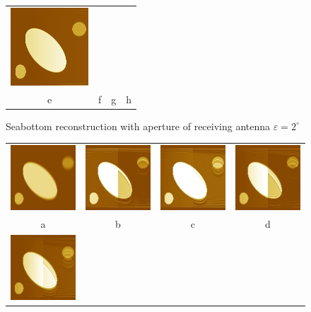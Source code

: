 \documentclass{procDDs}
\begin{document}
\begin{figure}[h!]
\begin{tabular}{cccc}
		\includegraphics[width=0.2\linewidth]{img/6/5.jpg}\\
		e & f & g & h \\
	\end{tabular}
	\caption{Seabottom reconstruction with aperture of receiving antenna $\varepsilon=2^\circ$ }
\end{figure}
\begin{figure}[h!]\center%
	\begin{tabular}{cccc}
		\includegraphics[width=0.2\linewidth]{img/7/1.jpg}&
		\includegraphics[width=0.2\linewidth]{img/7/3.jpg}&
		\includegraphics[width=0.2\linewidth]{img/7/4.jpg}&
		\includegraphics[width=0.2\linewidth]{img/7/5.jpg}\\
		a & b & c & d\\
		\includegraphics[width=0.2\linewidth]{img/7/6.jpg}&

\end{tabular}
\end{figure}
\end{document}
